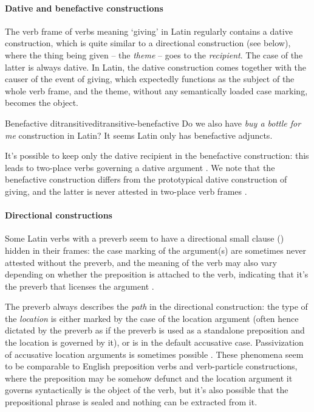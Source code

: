 \documentclass[a4paper, oneside, 12pt]{report}
\newcommand*{\citesec}[1]{\S~{#1}}
\newcommand*{\term}[1]{\emph{#1}}
\newcommand{\form}[1]{\emph{#1}}
\newcommand{\translate}[1]{`#1'}
\begin{document}
\paragraph*{Dative and benefactive constructions}
The verb frame of verbs meaning \translate{giving} in Latin regularly
contains a dative construction,
which is quite similar to a directional construction (see below),
where the thing being given -- the \term{theme} -- goes to the \term{recipient}.
The case of the latter is always dative. 
In Latin, the dative construction comes together with
the causer of the event of giving,
which expectedly functions as the subject of the whole verb frame,
and the theme, without any semantically loaded case marking, becomes the object.

\begin{todobox}{Benefactive ditransitive}{ditransitive-benefactive}
    Do we also have \form{buy a bottle for me} construction in Latin?
    It seems Latin only has benefactive adjuncts. 
\end{todobox}

It's possible to keep only the dative recipient in the benefactive construction:
this leads to two-place verbs governing a dative argument 
\citep[\citesec{4.24}]{Pinkster1}. 
We note that the benefactive construction differs from 
the prototypical dative construction of giving,
and the latter is never attested in two-place verb frames
\citep[\citesec{12.7}]{Pinkster1}.

\paragraph*{Directional constructions}
Some Latin verbs with a preverb seem to have a directional small clause
() hidden in their frames:
the case marking of the argument(s)
are sometimes never attested without the preverb,
and the meaning of the verb may also vary depending on whether the preposition is attached to the verb,
indicating that it's the preverb that licenses the argument
\citep{mare2018issues}.

The preverb always describes the \emph{path} in the directional construction:
the type of the \emph{location} is either marked by the case of the location argument
(often hence dictated by the preverb
as if the preverb is used as a standalone preposition
and the location is governed by it),
or is in the default accusative case.
Passivization of accusative location arguments is sometimes possible
\citep[\citesec{4.22}]{Pinkster1}.
These phenomena seem to be comparable to English preposition verbs and verb-particle constructions,
where the preposition may be somehow defunct
and the location argument it governs syntactically is the object of the verb,
but it's also possible that the prepositional phrase is sealed and nothing can be extracted from it.
\end{document}
